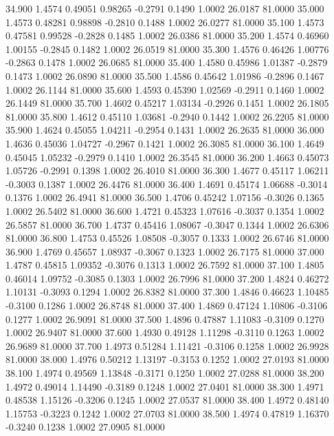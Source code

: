   34.900   1.4574   0.49051   0.98265  -0.2791   0.1490   1.0002  26.0187  81.0000
  35.000   1.4573   0.48281   0.98898  -0.2810   0.1488   1.0002  26.0277  81.0000
  35.100   1.4573   0.47581   0.99528  -0.2828   0.1485   1.0002  26.0386  81.0000
  35.200   1.4574   0.46960   1.00155  -0.2845   0.1482   1.0002  26.0519  81.0000
  35.300   1.4576   0.46426   1.00776  -0.2863   0.1478   1.0002  26.0685  81.0000
  35.400   1.4580   0.45986   1.01387  -0.2879   0.1473   1.0002  26.0890  81.0000
  35.500   1.4586   0.45642   1.01986  -0.2896   0.1467   1.0002  26.1144  81.0000
  35.600   1.4593   0.45390   1.02569  -0.2911   0.1460   1.0002  26.1449  81.0000
  35.700   1.4602   0.45217   1.03134  -0.2926   0.1451   1.0002  26.1805  81.0000
  35.800   1.4612   0.45110   1.03681  -0.2940   0.1442   1.0002  26.2205  81.0000
  35.900   1.4624   0.45055   1.04211  -0.2954   0.1431   1.0002  26.2635  81.0000
  36.000   1.4636   0.45036   1.04727  -0.2967   0.1421   1.0002  26.3085  81.0000
  36.100   1.4649   0.45045   1.05232  -0.2979   0.1410   1.0002  26.3545  81.0000
  36.200   1.4663   0.45073   1.05726  -0.2991   0.1398   1.0002  26.4010  81.0000
  36.300   1.4677   0.45117   1.06211  -0.3003   0.1387   1.0002  26.4476  81.0000
  36.400   1.4691   0.45174   1.06688  -0.3014   0.1376   1.0002  26.4941  81.0000
  36.500   1.4706   0.45242   1.07156  -0.3026   0.1365   1.0002  26.5402  81.0000
  36.600   1.4721   0.45323   1.07616  -0.3037   0.1354   1.0002  26.5857  81.0000
  36.700   1.4737   0.45416   1.08067  -0.3047   0.1344   1.0002  26.6306  81.0000
  36.800   1.4753   0.45526   1.08508  -0.3057   0.1333   1.0002  26.6746  81.0000
  36.900   1.4769   0.45657   1.08937  -0.3067   0.1323   1.0002  26.7175  81.0000
  37.000   1.4787   0.45815   1.09352  -0.3076   0.1313   1.0002  26.7592  81.0000
  37.100   1.4805   0.46014   1.09752  -0.3085   0.1303   1.0002  26.7996  81.0000
  37.200   1.4824   0.46272   1.10131  -0.3093   0.1294   1.0002  26.8382  81.0000
  37.300   1.4846   0.46623   1.10485  -0.3100   0.1286   1.0002  26.8748  81.0000
  37.400   1.4869   0.47124   1.10806  -0.3106   0.1277   1.0002  26.9091  81.0000
  37.500   1.4896   0.47887   1.11083  -0.3109   0.1270   1.0002  26.9407  81.0000
  37.600   1.4930   0.49128   1.11298  -0.3110   0.1263   1.0002  26.9689  81.0000
  37.700   1.4973   0.51284   1.11421  -0.3106   0.1258   1.0002  26.9928  81.0000
  38.000   1.4976   0.50212   1.13197  -0.3153   0.1252   1.0002  27.0193  81.0000
  38.100   1.4974   0.49569   1.13848  -0.3171   0.1250   1.0002  27.0288  81.0000
  38.200   1.4972   0.49014   1.14490  -0.3189   0.1248   1.0002  27.0401  81.0000
  38.300   1.4971   0.48538   1.15126  -0.3206   0.1245   1.0002  27.0537  81.0000
  38.400   1.4972   0.48140   1.15753  -0.3223   0.1242   1.0002  27.0703  81.0000
  38.500   1.4974   0.47819   1.16370  -0.3240   0.1238   1.0002  27.0905  81.0000
